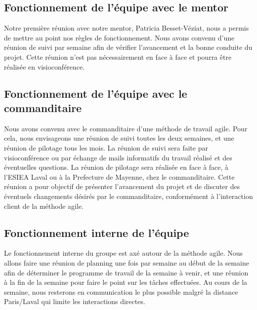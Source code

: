 \subsection {Fonctionnement de l'équipe avec le mentor}
Notre première réunion avec notre mentor, Patricia Besset-Véziat, nous a permis de mettre au point nos règles de fonctionnement.
Nous avons convenu d'une réunion de suivi par semaine afin de vérifier l'avancement et la bonne conduite du projet.
Cette réunion n'est pas nécessairement en face à face et pourra être réalisée en visioconférence.


\subsection {Fonctionnement de l'équipe avec le commanditaire}
Nous avons convenu avec le commanditaire d'une méthode de travail agile.
Pour cela, nous envisageons une réunion de suivi toutes les deux semaines, et une réunion de pilotage tous les mois.
La réunion de suivi sera faite par visioconférence ou par échange de mails informatifs du travail réalisé et des éventuelles questions.
La réunion de pilotage sera réalisée en face à face, à l'ESIEA Laval ou à la Prefecture de Mayenne, chez le commanditaire.
Cette réunion a pour objectif de présenter l'avancement du projet et de discuter des éventuels changements désirés par le commanditaire, conformément à l'interaction client de la méthode agile.


\subsection {Fonctionnement interne de l'équipe}
Le fonctionnement interne du groupe est axé autour de la méthode agile.
Nous allons faire une réunion de planning une fois par semaine au début de la semaine afin de déterminer le programme de travail de la semaine à venir, et une réunion à la fin de la semaine pour faire le point sur les tâches effectuées.
Au cours de la semaine, nous resterons en communication le plus possible malgré la distance Paris/Laval qui limite les interactions directes.


